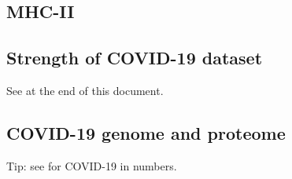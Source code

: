 %   

\subsection{MHC-II}



%   

%   


\subsection{Strength of COVID-19 dataset}

See at the end of this document.

\subsection{COVID-19 genome and proteome}

Tip: see \cite{bar2020sars} for COVID-19 in numbers.


